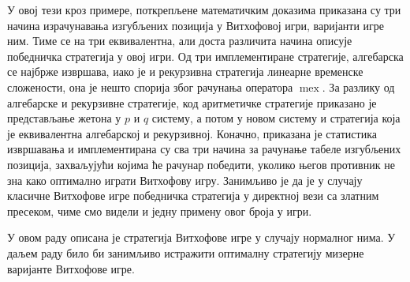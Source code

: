 \documentclass[a4paper]{article}
\DeclareMathOperator{\mex}{mex}
\begin{document}
У овој тези кроз примере, поткрепљене математичким доказима приказана су три начина израчунавања изгубљених позиција у Витхофовој игри, варијанти игре ним. Тиме се на три еквивалентна, али доста различита начина описује победничка стратегија у овој игри. Од три имплементиране стратегије, алгебарска се најбрже извршава, иако је и рекурзивна стратегија линеарне временске сложености, она је нешто спорија због рачунања оператора $ \mex $. За разлику од алгебарске и рекурзивне стратегије, код аритметичке стратегије приказано је представљање жетона у $ p $ и $ q $ систему, а потом у новом систему и стратегија која је еквивалентна алгебарској и рекурзивној. Коначно, приказана је статистика извршавања и имплементирана су сва три начина за рачунање табеле изгубљених позиција,  захваљујући којима ће рачунар победити, уколико његов противник не зна како оптимално играти Витхофову игру.  
Занимљиво је да је у случају класичне Витхофове игре победничка стратегија у директној вези са златним пресеком, чиме смо видели и једну примену овог броја у игри.

У овом раду описана је стратегија Витхофове игре у случају нормалног нима. У даљем раду било би занимљиво истражити оптималну стратегију мизерне варијанте Витхофове игре. 

%
\newpage
{}
\appendix
 

\end{document}
